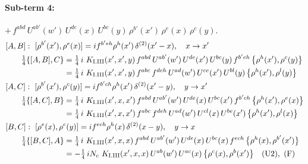 \documentclass[10pt]{article}
\numberwithin{equation}{section}
\begin{document}
\paragraph{Sub-term 4:} $+\,f^{abd}\,U^{ab'}(w')\,U^{de}(x)\,U^{bc}(y)\,\rho^{b'}(x')\,\rho^{e}(x)\,\rho^{c}(y)$.
\begin{align}
&[A,B]:\ [\rho^{b'}(x'),\rho^{e}(x)]=i f^{b'eh}\rho^{h}(x')\,\delta^{(2)}(x'-x),\quad x\to x'\notag\\
&\qquad \tfrac14\{[A,B],C\}=\tfrac14\,i\,\,K_{\rm I.III}(x',x',y)\,f^{abd}\,U^{ab'}(w')\,U^{de}(x')\,U^{bc}(y)\,f^{b'eh}\,\big\{\rho^{h}(x'),\rho^{c}(y)\big\}\notag\\
&\qquad\phantom{\tfrac14\{[A,B],C\}}=\tfrac14\,i\,\,K_{\rm I.III}(x',x',y)\,f^{abc}\,f^{deh}\,U^{ad}(w')\,U^{ce}(x')\,U^{bl}(y)\,\big\{\rho^{h}(x'),\rho^{l}(y)\big\}
\label{eq:GI.III-4-AB}\\
&[A,C]:\ [\rho^{b'}(x'),\rho^{c}(y)]=i f^{b'ch}\rho^{h}(x')\,\delta^{(2)}(x'-y),\quad y\to x'\notag\\
&\qquad \tfrac14\{[A,C],B\}=\tfrac14\,i\,\,K_{\rm I.III}(x',x,x')\,f^{abd}\,U^{ab'}(w')\,U^{de}(x)\,U^{bc}(x')\,f^{b'ch}\,\big\{\rho^{h}(x'),\rho^{e}(x)\big\}\notag\\
&\qquad\phantom{\tfrac14\{[A,C],B\}}=\tfrac14\,i\,\,K_{\rm I.III}(x',x,x')\,f^{abc}\,f^{deh}\,U^{ad}(w')\,U^{cl}(x)\,U^{be}(x')\,\big\{\rho^{h}(x'),\rho^{l}(x)\big\}
\label{eq:GI.III-4-AC}\\
&[B,C]:\ [\rho^{e}(x),\rho^{c}(y)]=i f^{ech}\rho^{h}(x)\,\delta^{(2)}(x-y),\quad y\to x\notag\\
&\qquad \tfrac14\{[B,C],A\}=\tfrac14\,i\,\,K_{\rm I.III}(x',x,x)\,f^{abd}\,U^{ab'}(w')\,U^{de}(x)\,U^{bc}(x)\,f^{ech}\,\big\{\rho^{h}(x),\rho^{b'}(x')\big\}\notag\\
&\qquad\phantom{\tfrac14\{[B,C],A\}}=-\tfrac14\,i N_{c}\,\,K_{\rm I.III}(x',x,x)\,U^{ab}(w')\,U^{ac}(x)\,\big\{\rho^{c}(x),\rho^{b}(x')\big\}\quad\text{(U2)},\ \text{(F)}
\label{eq:GI.III-4-BC}
\end{align}
\end{document}
